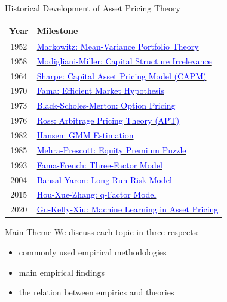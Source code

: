 \documentclass{beamer}
\begin{document}
\begin{frame}{Historical Development of Asset Pricing Theory}
\small{
\begin{center}
\begin{tabular}{cl}
	\toprule
	\textbf{Year} & \textbf{Milestone} \\
	\midrule
	1952 & \href{https://doi.org/10.1111/j.1540-6261.1952.tb01525.x}{\textcolor{blue}{Markowitz: Mean-Variance Portfolio Theory}} \\
	1958 & \href{https://www.jstor.org/stable/1809766}{\textcolor{blue}{Modigliani-Miller: Capital Structure Irrelevance}} \\
	1964 & \href{https://doi.org/10.1111/j.1540-6261.1964.tb02865.x}{\textcolor{blue}{Sharpe: Capital Asset Pricing Model (CAPM)}} \\
	1970 & \href{https://doi.org/10.2307/2325486}{\textcolor{blue}{Fama: Efficient Market Hypothesis}} \\
	1973 & \href{https://doi.org/10.1086/260062}{\textcolor{blue}{Black-Scholes-Merton: Option Pricing}} \\
	1976 & \href{https://doi.org/10.1016/0022-0531(76)90046-6}{\textcolor{blue}{Ross: Arbitrage Pricing Theory (APT)}} \\
	1982 & \href{https://doi.org/10.2307/1912775}{\textcolor{blue}{Hansen: GMM Estimation}} \\
	1985 & \href{https://doi.org/10.1016/0304-3932(85)90061-3}{\textcolor{blue}{Mehra-Prescott: Equity Premium Puzzle}} \\
	1993 & \href{https://doi.org/10.1016/0304-405X(93)90023-5}{\textcolor{blue}{Fama-French: Three-Factor Model}} \\
	2004 & \href{https://doi.org/10.1111/j.1540-6261.2004.00670.x}{\textcolor{blue}{Bansal-Yaron: Long-Run Risk Model}} \\
	2015 & \href{https://doi.org/10.1093/rfs/hhu068}{\textcolor{blue}{Hou-Xue-Zhang: q-Factor Model}} \\
	2020 & \href{https://doi.org/10.1093/rfs/hhaa009}{\textcolor{blue}{Gu-Kelly-Xiu: Machine Learning in Asset Pricing}} \\
	\bottomrule
\end{tabular}
\end{center}
}
\end{frame}

\begin{frame}{Main Theme}
	We discuss each topic in three respects:
	\begin{itemize}
		\item commonly used empirical methodologies
		\item main empirical findings
		\item the relation between empirics and theories
	\end{itemize}
\end{frame}
\end{document}
